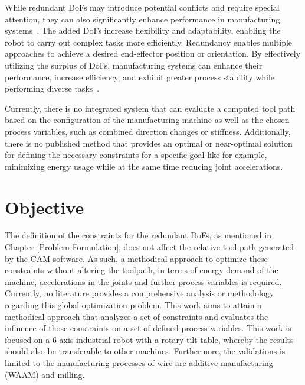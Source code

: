 
While redundant \acrshort{DoF}s may introduce potential conflicts and require special attention, they can also significantly enhance performance in manufacturing systems~\cite{Ayten.2016}. The added \acrshort{DoF}s increase flexibility and adaptability, enabling the robot to carry out complex tasks more efficiently. Redundancy enables multiple approaches to achieve a desired end-effector position or orientation. By effectively utilizing the surplus of \acrshort{DoF}s, manufacturing systems can enhance their performance, increase efficiency, and exhibit greater process stability while performing diverse tasks~\cite{Boscariol.2020}. 

Currently, there is no integrated system that can evaluate a computed tool path based on the configuration of the manufacturing machine as well as the chosen process variables, such as combined direction changes or stiffness. %
Additionally, there is no published method that provides an optimal or near-optimal solution for defining the necessary constraints for a specific goal like for example, minimizing energy usage while at the same time reducing joint accelerations.


\section{Objective}\label{OBJECTIVE}
The definition of the constraints for the redundant \acrshort{DoF}s, as mentioned in Chapter \ref{Problem Formulation}, does not affect the relative tool path generated by the \acrshort{CAM} software. As such, a methodical approach to optimize these constraints without altering the toolpath, in terms of energy demand of the machine, accelerations in the joints and further process variables is required. Currently, no literature provides a comprehensive analysis or methodology regarding this global optimization problem.
This work aims to attain a methodical approach that analyzes a set of constraints and evaluates the influence of those constraints on a set of defined process variables. This work is focused on a 6-axis industrial robot with a rotary-tilt table, whereby the results should also be transferable to other machines. Furthermore, the validations is limited to the manufacturing processes of wire arc additive manufacturing (\acrshort{WAAM}) and milling. 


